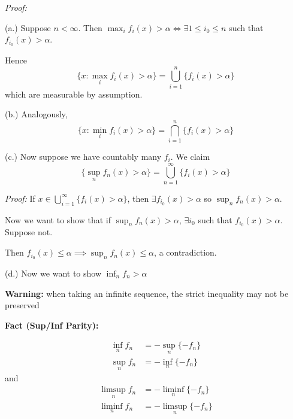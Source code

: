 \documentclass[12pt]{report}
\newenvironment*{tbox}[2][gray]{
    \begin{tcolorbox}[
        parbox=false,
        colback=#1!5!white,
        colframe=#1!75!black,
        breakable,
        title={#2}
    ]}
    {\end{tcolorbox}}
\newenvironment*{proof}[1][blue]{
\begin{tcolorbox}[
    parbox=false,
    colback=#1!5!white,
    colframe=#1!75!black,
    breakable
]}
{\end{tcolorbox}}
\begin{document}
    \begin{tbox}{\textbf{Proposition:} If $\{f_n\}$ are measurable, so are 
        \begin{enumerate}[label=(\alph*)]
            \item $\max_i f_i(x)$
            \item $\min_i f_i(x)$
            \item $\sup_n f_n$
            \item $\inf_n f_n$
            \item $\limsup_n f_n$
            \item $\liminf_n f_n$
        \end{enumerate}}
        \emph{Proof:}

        (a.) Suppose $n < \infty$. Then $\max_i f_i(x) > \alpha \iff \exists 1 \leq i_0 \leq n$ such that $f_{i_0}(x) > \alpha$. 

        Hence 
        \[\{x: \max_i f_i(x) > \alpha\} = \bigcup_{i=1}^n \{f_i(x) > \alpha\}\] 
        which are measurable by assumption. 

        (b.) Analogously, 
        \[\{x: \min_i f_i(x) > \alpha\} = \bigcap_{i=1}^n \{f_i(x) > \alpha\}\]

        (c.) Now suppose we have countably many $f_i$. We claim 
        \[\{\sup_n f_n(x) > \alpha\} = \bigcup_{n=1}^\infty \{f_i(x) > \alpha\}\]

        \begin{proof}
            \emph{Proof:} If $x \in \bigcup_{i=1}^\infty \{f_i(x) > \alpha\}$, then $\exists f_{i_0}(x) > \alpha$ so $\sup_n f_n(x) > \alpha$. 

            Now we want to show that if $\sup_n f_n(x) > \alpha$, $\exists i_0$ such that $f_{i_0}(x) > \alpha$. Suppose not. 

            Then $f_{i_0}(x) \leq \alpha \implies \sup_n f_n(x) \leq \alpha$, a contradiction.
        \end{proof}

        (d.) Now we want to show $\inf_n f_n > \alpha$
        
        \textbf{Warning:} when taking an infinite sequence, the strict inequality may not be preserved

        \begin{proof}
            \textbf{Fact (Sup/Inf Parity):} 

            \begin{align*}
                \inf_n f_n &= -\sup_n \{-f_n\}\\ 
                \sup_n f_n &= -\inf_n \{-f_n\}
            \end{align*}
            and 
            \begin{align*}
                \limsup_n f_n &= -\liminf_n \{-f_n\}\\
                \liminf_n f_n &= -\limsup_n \{-f_n\}
            \end{align*}
        \end{proof}


\end{tbox}
\end{document}

